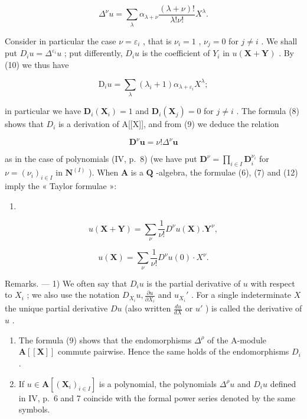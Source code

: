 \[
\Delta^ {\nu} u = \sum_ {\lambda} \alpha_ {\lambda + \nu} \frac {(\lambda + \nu) !}{\lambda ! \nu !} X ^ {\lambda}.\tag{10}
\]

Consider in particular the case \(\nu = \varepsilon_{i}\) , that is \(\nu_{i} = 1\) , \(\nu_{j} = 0\) for \(j \neq i\) . We shall put \(D_{i}u = \Delta^{\varepsilon_{i}}u\) ; put differently, \(D_{i}u\) is the coefficient of \(Y_{i}\) in \(u(\mathbf{X} + \mathbf{Y})\) . By (10) we thus have

\[
\mathrm{D} _ {i} u = \sum_ {\lambda} (\lambda_ {i} + 1) \alpha_ {\lambda + \varepsilon_ {i}} X ^ {\lambda};\tag{11}
\]

in particular we have \(\mathbf{D}_{i}(\mathbf{X}_{i})=1\) and \(\mathbf{D}_{i}(\mathbf{X}_{j})=0\) for \(j\neq i\) . The formula (8) shows that \(D_{i}\) is a derivation of A{[}{[}X{]}{]}, and from (9) we deduce the relation

\[
\mathbf {D} ^ {\nu} \boldsymbol {u} = \nu ! \Delta^ {\nu} \boldsymbol {u}\tag{12}
\]

as in the case of polynomials (IV, p.~8) (we have put \(\mathbf{D}^{\nu} = \prod_{i\in I}\mathbf{D}_{i}^{\nu_{i}}\) for \(\nu = (\nu_{i})_{i\in I}\) in \(\mathbf{N}^{(I)}\) ). When \(\mathbf{A}\) is a \(\mathbf{Q}\) -algebra, the formulae (6), (7) and (12) imply the « Taylor formulae »:

\begin{enumerate}
\def\labelenumi{(\arabic{enumi})}
\setcounter{enumi}{12}
\tightlist
\item
\end{enumerate}

\[
u (\mathbf {X} + \mathbf {Y}) = \sum_ {\nu} \frac {1}{\nu !} D ^ {\nu} u (\mathbf {X}). \mathbf {Y} ^ {\nu},
\]

\[
u (\mathbf {X}) = \sum_ {\nu} \frac {1}{\nu !} D ^ {\nu} u (0) \cdot X ^ {\nu}.\tag{14}
\]

Remarks. --- 1) We often say that \(D_i u\) is the partial derivative of \(u\) with respect to \(X_i\) ; we also use the notation \(D_{X_i} u, \frac{\partial u}{\partial X_i}\) and \(u_{X_i}'\) . For a single indeterminate \(X\) the unique partial derivative \(Du\) (also written \(\frac{du}{dX}\) or \(u'\) ) is called the derivative of \(u\) .

\begin{enumerate}
\def\labelenumi{\arabic{enumi})}
\setcounter{enumi}{1}
\item
  The formula (9) shows that the endomorphisms \(\Delta^{\rho}\) of the A-module \(\mathbf{A}[[\mathbf{X}]]\) commute pairwise. Hence the same holds of the endomorphisms \(D_i\) .
\item
  If \(u \in \mathbf{A}[(\mathbf{X}_i)_{i \in I}]\) is a polynomial, the polynomials \(\Delta^{\rho} u\) and \(D_i u\) defined in IV, p.~6 and 7 coincide with the formal power series denoted by the same symbols.
\end{enumerate}

